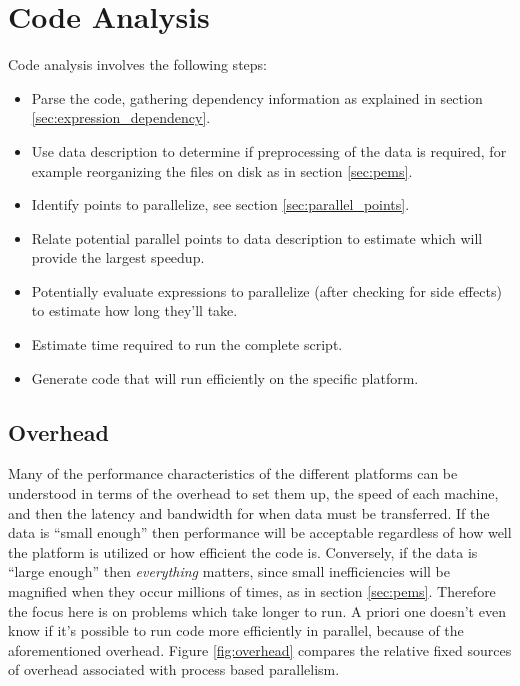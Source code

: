 \documentclass[12pt]{article}
\begin{document}

\section{Code Analysis}

Code analysis involves the following steps:

\begin{itemize}
    \item Parse the code, gathering dependency information as explained in
        section \ref{sec:expression_dependency}.

    \item Use data description to determine if preprocessing of the data is required, for example
        reorganizing the files on disk as in section \ref{sec:pems}.
    \item Identify points to parallelize, see section
        \ref{sec:parallel_points}.
    \item Relate potential parallel points to data description to estimate
        which will provide the largest speedup.
    \item Potentially evaluate expressions to parallelize (after checking for side
        effects) to estimate how long they'll take.
    \item Estimate time required to run the complete script.
    \item Generate code that will run efficiently on the specific platform.
\end{itemize}

\subsection{Overhead}

Many of the performance characteristics of the different platforms can be
understood in terms of the overhead to set them up, the speed of each
machine, and then the latency and bandwidth for when data must be
transferred.  If the data is ``small enough'' then performance will be
acceptable regardless of how well the platform is utilized or how efficient
the code is. Conversely, if the data is ``large enough'' then
\emph{everything} matters, since small inefficiencies will be magnified
when they occur millions of times, as in section \ref{sec:pems}.  Therefore
the focus here is on problems which take longer to run. A priori one
doesn't even know if it's possible to run code more efficiently in
parallel, because of the aforementioned overhead.
Figure \ref{fig:overhead} compares the relative fixed sources of overhead
associated with process based parallelism.
\end{document}
